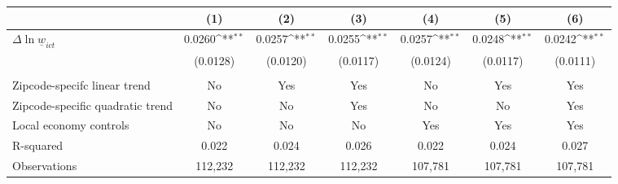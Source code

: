 {
\def\sym#1{\ifmmode^{#1}\else\(^{#1}\)\fi}
\begin{tabular}{l*{6}{c}}
\hline\hline
          &\multicolumn{1}{c}{(1)}         &\multicolumn{1}{c}{(2)}         &\multicolumn{1}{c}{(3)}         &\multicolumn{1}{c}{(4)}         &\multicolumn{1}{c}{(5)}         &\multicolumn{1}{c}{(6)}         \\
\hline
$\Delta \ln \underline{w}_{ict}$&   0.0260\sym{**} &   0.0257\sym{**} &   0.0255\sym{**} &   0.0257\sym{**} &   0.0248\sym{**} &   0.0242\sym{**} \\
          & (0.0128)         & (0.0120)         & (0.0117)         & (0.0124)         & (0.0117)         & (0.0111)         \\
\hline
\vspace{-2mm}&                  &                  &                  &                  &                  &                  \\
Zipcode-specifc linear trend&       No         &      Yes         &      Yes         &       No         &      Yes         &      Yes         \\
Zipcode-specific quadratic trend&       No         &       No         &      Yes         &       No         &       No         &      Yes         \\
Local economy controls&       No         &       No         &       No         &      Yes         &      Yes         &      Yes         \\
R-squared &    0.022         &    0.024         &    0.026         &    0.022         &    0.024         &    0.027         \\
Observations&  112,232         &  112,232         &  112,232         &  107,781         &  107,781         &  107,781         \\
\hline\hline
\end{tabular}
}
